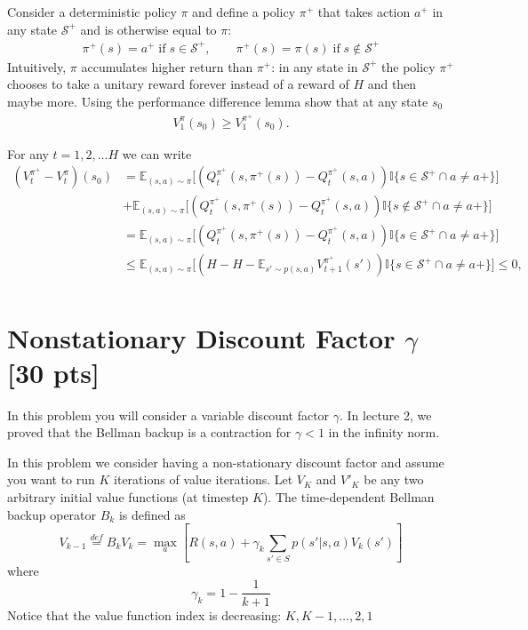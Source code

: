 \documentclass[11pt]{article}
\newcommand{\E}{\mathbb E}
\begin{document}
Consider a deterministic policy $\pi$ and define a policy $\pi^+$ that takes action $a^+$ in any state $\mathcal S^+$ and is otherwise equal to $\pi$:
\begin{align}
    \pi^+(s) = a^+ \; \text{if} \; s \in \mathcal S^+, \quad \quad \pi^+(s) = \pi(s) \; \text{if} \; s \not\in \mathcal S^+
\end{align}
Intuitively, $\pi$ accumulates higher return than $\pi^+$: in any state in $\mathcal S^+$ the policy $\pi^+$ chooses to take a unitary reward forever instead of a reward of $H$ and then maybe more.
Using the performance difference lemma show that at any state $s_0$
\begin{align}
    V^{\pi}_{1}(s_0) \geq  V^{\pi^+}_{1}(s_0).
\end{align}


\begin{tcolorbox}[breakable]

For any $t =1,2,\dots H$ we can write
\begin{align}
  (V_t^{\pi^+} - V_t^{\pi})(s_0) & = \E_{(s,a) \sim \pi} \Big[(Q_t^{\pi^+}(s,\pi^+(s)) - Q_t^{\pi^+}(s,a))\mathbb{I}\{s \in \mathcal S^+ \cap a \neq a+ \}\Big]\\
  &  + \E_{(s,a) \sim \pi} \Big[(Q_t^{\pi^+}(s,\pi^+(s)) - Q_t^{\pi^+}(s,a))\mathbb{I}\{s \not \in \mathcal S^+ \cap a \neq a+\} \Big]\\
  & = \E_{(s,a) \sim \pi} \Big[(Q_t^{\pi^+}(s,\pi^+(s)) - Q_t^{\pi^+}(s,a))\mathbb{I}\{s \in \mathcal S^+\cap a \neq a+ \}\Big]\\ 
  & \leq \E_{(s,a) \sim \pi} \Big[(H - H -  \E_{s' \sim p(s,a)}V_{t+1}^{\pi^+}(s'))\mathbb{I}\{s \in \mathcal S^+\cap a \neq a+ \}\Big] \leq 0,\\
\end{align}

\end{tcolorbox}

\newpage


\section{Nonstationary Discount Factor $\gamma$ [30 pts]}

In this problem you will consider a variable discount factor $\gamma$. In lecture 2, we proved that the Bellman backup is a contraction for $\gamma < 1$ in the infinity norm. 

In this problem we consider having a non-stationary discount factor and assume you want to run $K$ iterations of value iterations. Let $V_K$ and $V'_K$ be any two arbitrary initial value functions (at timestep $K$).
The time-dependent Bellman backup operator $B_k$ is defined as
\begin{equation}
    V_{k-1} \overset{def}{=} B_{k}V_{k} = \max_a[ R(s, a) + \gamma_k\sum_{s' \in S}p(s'|s,a)V_{k}(s')]
\end{equation}
where
\begin{equation}
    \gamma_{k} = 1 - \frac{1}{k+1}
\end{equation}
Notice that the value function index is decreasing: $K,K-1,\dots,2,1$
\end{document}
